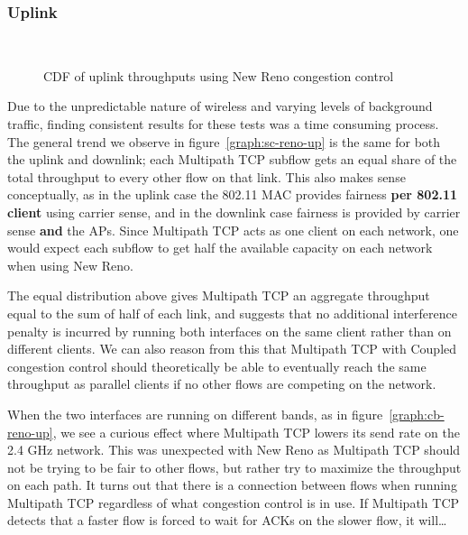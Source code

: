 \subsubsection{Uplink}
\label{sec:results-mptcp-up}

\begin{figure}[h]
 \centering
 \subfloat[][2.4 GHz, disparate channel] {\
   \scalebox{0.55}{}\label{graph:cc-reno-up}
 }
 \\
 \subfloat[][5 and 2.4 GHz] {\
   \scalebox{0.55}{}\label{graph:cb-reno-up}
 }

 \caption{CDF of uplink throughputs using New Reno congestion control}\label{graph:reno-up}
\end{figure}

Due to the unpredictable nature of wireless and varying levels of background
traffic, finding consistent results for these tests was a time consuming
process. The general trend we observe in figure~\ref{graph:sc-reno-up} is the
same for both the uplink and downlink; each Multipath TCP subflow gets an equal
share of the total throughput to every other flow on that link. This also makes
sense conceptually, as in the uplink case the 802.11 MAC provides fairness
\textbf{per 802.11 client} using carrier sense, and in the downlink case
fairness is provided by carrier sense \textbf{and} the APs. Since Multipath TCP
acts as one client on each network, one would expect each subflow to get half
the available capacity on each network when using New Reno.

The equal distribution above gives Multipath TCP an aggregate throughput equal
to the sum of half of each link, and suggests that no additional interference
penalty is incurred by running both interfaces on the same client rather than on
different clients. We can also reason from this that Multipath TCP with Coupled
congestion control should theoretically be able to eventually reach the same
throughput as parallel clients if no other flows are competing on the network.

When the two interfaces are running on different bands, as in
figure~\ref{graph:cb-reno-up}, we see a curious effect where Multipath TCP
lowers its send rate on the 2.4 GHz network. This was unexpected with New Reno
as Multipath TCP should not be trying to be fair to other flows, but rather try
to maximize the throughput on each path. It turns out that there is a connection
between flows when running Multipath TCP regardless of what congestion control
is in use. If Multipath TCP detects that a faster flow is forced to wait for
ACKs on the slower flow, it will…

